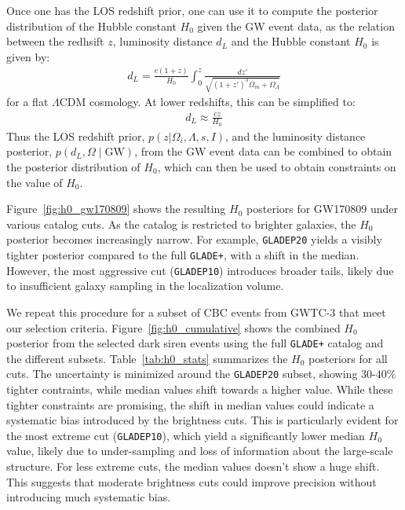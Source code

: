 Once one has the \ac{LOS} redshift prior, one can use it to compute the posterior distribution of the Hubble constant $H_0$ given the \ac{GW} event data, as the relation between the redhsift $z$, luminosity distance $d_L$ and the Hubble constant $H_0$ is given by:
\begin{align}
  d_L = \frac{c(1+z)}{H_0} \int_0^z \frac{dz'}{\sqrt{(1+z')^3\Omega_m + \Omega_\Lambda}}
\end{align}
for a flat $\Lambda$CDM cosmology. At lower redshifts, this can be simplified to:
\begin{align}
  d_L \approx \frac{cz}{H_0}
\end{align}
Thus the \ac{LOS} redshift prior, $p(z|\Omega_i, \Lambda, s, I)$, and the luminosity distance posterior, $p(d_L,\Omega\mid\mathrm{GW})$, from the \ac{GW} event data can be combined to obtain the posterior distribution of $H_0$, which can then be used to obtain constraints on the value of $H_0$.

Figure~\ref{fig:h0_gw170809} shows the resulting $H_0$ posteriors for GW170809 under various catalog cuts. As the catalog is restricted to brighter galaxies, the $H_0$ posterior becomes increasingly narrow. For example, \texttt{GLADEP20} yields a visibly tighter posterior compared to the full \texttt{GLADE+}, with a shift in the median. However, the most aggressive cut (\texttt{GLADEP10}) introduces broader tails, likely due to insufficient galaxy sampling in the localization volume.

We repeat this procedure for a subset of \ac{CBC} events from \ac{GWTC}-3 that meet our selection criteria. Figure~\ref{fig:h0_cumulative} shows the combined $H_0$ posterior from the selected dark siren events using the full \texttt{GLADE+} catalog and the different subsets. Table~\ref{tab:h0_stats} summarizes the $H_0$ posteriors for all cuts. The uncertainty is minimized around the \texttt{GLADEP20} subset, showing 30-40\% tighter contraints, while median values shift towards a higher value. While these tighter constraints are promising, the shift in median values could indicate a systematic bias introduced by the brightness cuts. This is particularly evident for the most extreme cut (\texttt{GLADEP10}), which yield a significantly lower median $H_0$ value, likely due to under-sampling and loss of information about the large-scale structure. For less extreme cuts, the median values doesn't show a huge shift. This suggests that moderate brightness cuts could improve precision without introducing much systematic bias.

